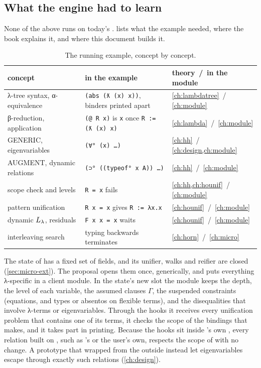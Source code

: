 \subsection{What the engine had to learn}

None of the above runs on today's \micro.  lists what the example needed, where
the book explains it, and where this document builds it.
\begin{table}[h]
\small
\begin{tabularx}{\linewidth}{@{}>{\raggedright\arraybackslash}p{4.4cm}>{\raggedright\arraybackslash}X>{\raggedright\arraybackslash}p{4.3cm}@{}}
\toprule
concept & in the example & theory \,/\, in the module\\
\midrule
λ-tree syntax, α-equivalence & \texttt{(abs (ƛ (x) x))}, binders printed apart & \cref{ch:lambdatree} \,/\, \cref{ch:module}\\
β-reduction, application & \texttt{(@ R x)} is \texttt{x} once \texttt{R := (ƛ (x) x)} & \cref{ch:lambda} \,/\, \cref{ch:module}\\
GENERIC, eigenvariables & \texttt{(∀° (x) …)} & \cref{ch:hh} \,/\, \cref{ch:design,ch:module}\\
AUGMENT, dynamic relations & \texttt{(⊃° ((typeof° x A)) …)} & \cref{ch:hh} \,/\, \cref{ch:module}\\
scope check and levels & \texttt{R = x} fails & \cref{ch:hh,ch:hounif} \,/\, \cref{ch:module}\\
pattern unification & \texttt{R x = x} gives \texttt{R := λx.x} & \cref{ch:hounif} \,/\, \cref{ch:module}\\
dynamic $L_\lambda$, residuals & \texttt{F x x = x} waits & \cref{ch:hounif} \,/\, \cref{ch:module}\\
interleaving search & typing backwards terminates & \cref{ch:horn} \,/\, \cref{ch:micro}\\
\bottomrule
\end{tabularx}
\caption{The running example, concept by concept.}\label{tab:intro-concepts}
\end{table}

The state of \micro{} has a fixed set of fields, and its unifier, walks and reifier are closed
(\cref{sec:micro-ext}). The proposal opens them once, generically, and puts everything λ-specific in a
client module. In the state's new slot the module keeps the depth, the level of each variable, the
assumed clauses $\Gamma$, the suspended constraints (equations, and types or absentos on flexible
terms), and the disequalities that involve λ-terms or eigenvariables. Through the hooks it receives every
unification problem that contains one of its terms, it checks the scope of the bindings that 
makes, and it takes part in printing. Because the hooks sit inside \micro's own , every relation
built on , such as \micro's  or the user's own, respects the scope of  with no
change. A prototype that wrapped \micro{} from the outside instead let eigenvariables escape through exactly
such relations (\cref{ch:design}).

